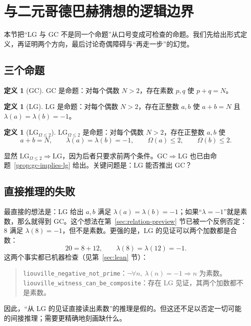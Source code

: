 \documentclass[11pt,a4paper]{ctexart}
\theoremstyle{plain}
\theoremstyle{definition}
\newtheorem{definition}[theorem]{定义}
\newcommand{\li}{\lambda}
\newcommand{\Om}{\Omega}
\newcommand{\GC}{\mathrm{GC}}
\newcommand{\LG}{\mathrm{LG}}
\newcommand{\LGtwo}{\mathrm{LG}_{\Om\le2}}
\newcommand{\code}[1]{\texttt{#1}}
\begin{document}
\section{与二元哥德巴赫猜想的逻辑边界}
\label{sec:boundary}

本节把“LG 与 GC 不是同一个命题”从口号变成可检查的命题。我们先给出形式定义，再证明两个方向，最后讨论奇偶障碍与“再走一步”的幻觉。

\subsection{三个命题}
\label{sec:three-props}

\begin{definition}[GC]
\label{def:GC}
$\GC$ 是命题：对每个偶数 $N>2$，存在素数 $p,q$ 使 $p+q=N$。
\end{definition}

\begin{definition}[LG]
\label{def:LG-again}
$\LG$ 是命题：对每个偶数 $N>2$，存在正整数 $a,b$ 使 $a+b=N$ 且 $\li(a)=\li(b)=-1$。
\end{definition}

\begin{definition}[$\LGtwo$]
\label{def:LGtwo-again}
$\LGtwo$ 是命题：对每个偶数 $N>2$，存在正整数 $a,b$ 使
\[
  a+b=N,\qquad \li(a)=\li(b)=-1,\qquad \Om(a)\le2,\qquad \Om(b)\le2.
\]
\end{definition}

显然 $\LGtwo\Rightarrow\LG$，因为后者只要求前两个条件。$\GC\Rightarrow\LG$ 也已由命题~\ref{prop:gc-implies-lg} 给出。关键问题是：$\LG$ 能否推出 $\GC$？

\subsection{直接推理的失败}
\label{sec:naive-failure}

最直接的想法是：LG 给出 $a,b$ 满足 $\li(a)=\li(b)=-1$；如果“$\li=-1$”就是素数，那么就得到 GC。这个想法在第~\ref{sec:relation-preview} 节已被一个反例否定：$8$ 满足 $\li(8)=-1$，但不是素数。更强的是，LG 的见证可以两个加数都是合数：
\[
  20=8+12,\qquad \li(8)=\li(12)=-1.
\]
这两个事实都已机器检查（见第~\ref{sec:lean} 节）：
\begin{quote}
\code{liouville\_negative\_not\_prime}：$\neg\forall n,\ \li(n)=-1\Rightarrow n$ 为素数。\\
\code{liouville\_witness\_can\_be\_composite}：存在 LG 见证，其两个加数都不是素数。
\end{quote}
因此，“从 LG 的见证直接读出素数”的推理是假的。但这还不足以否定一切可能的间接推理；需要更精确地刻画缺什么。
\end{document}
